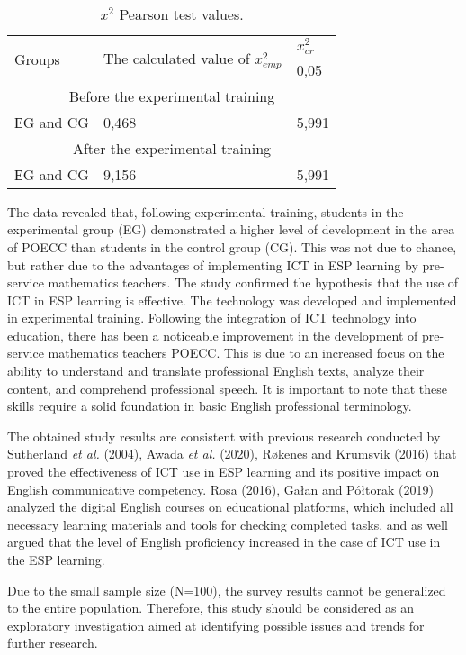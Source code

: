 \begin{table}[!htpb]
\centering
\begin{threeparttable}
\caption{$x^{2}$ Pearson test values.}
\label{tab-06}
\begin{tabular}{lll}
\toprule
\multirow{2}{*}{Groups} & \multicolumn{1}{p{3cm}}{\multirow{2}{=}{The calculated value of $x_{emp}^{2} $}} & $x_{cr}^{2} $ \\ 
 & & 0,05 \\
\midrule
\multicolumn{3}{c}{Before the experimental training} \\ 
ЕG and CG & 0,468 & 5,991 \\[0.3cm]
\multicolumn{3}{c}{After the experimental training} \\ 
ЕG and CG & 9,156 & 5,991 \\
\bottomrule
\end{tabular}
\end{threeparttable}
\end{table}
	
The data revealed that, following experimental training, students in the
experimental group (EG) demonstrated a higher level of development in
the area of POECC than students in the control group (CG). This was not
due to chance, but rather due to the advantages of implementing ICT in
ESP learning by pre-service mathematics teachers. The study confirmed
the hypothesis that the use of ICT in ESP learning is effective. The
technology was developed and implemented in experimental training.
Following the integration of ICT technology into education, there has
been a noticeable improvement in the development of pre-service
mathematics teachers\textquotesingle{} POECC. This is due to an
increased focus on the ability to understand and translate professional
English texts, analyze their content, and comprehend professional
speech. It is important to note that these skills require a solid
foundation in basic English professional terminology.

The obtained study results are consistent with previous research
conducted by Sutherland \emph{et al.} (2004), Awada \emph{et al.}
(2020), Røkenes and Krumsvik (2016) that proved the effectiveness of ICT
use in ESP learning and its positive impact on English communicative
competency. Rosa (2016), Gałan and Półtorak (2019) analyzed the digital
English courses on educational platforms, which included all necessary
learning materials and tools for checking completed tasks, and as well
argued that the level of English proficiency increased in the case of
ICT use in the ESP learning.


Due to the small sample size (N=100), the survey results cannot be
generalized to the entire population. Therefore, this study should be
considered as an exploratory investigation aimed at identifying possible
issues and trends for further research.

	
